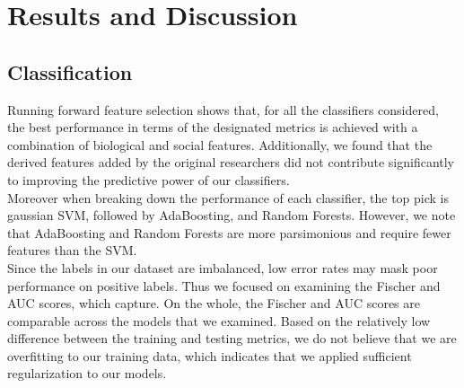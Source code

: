 \documentclass[twoside,twocolumn,paper=letter,fontsize=11pt]{article}
\begin{document}
\section{Results and Discussion}
\subsection{Classification}

Running forward feature selection shows that, for all the classifiers
considered, the best performance in terms of the designated metrics is achieved
with a combination of biological and social features. Additionally, we found that
the derived features added by the original researchers did not contribute
significantly to improving the predictive power of our classifiers.\\

Moreover when breaking down the performance of each classifier, the top pick is
gaussian SVM, followed by AdaBoosting, and Random Forests. However, we note
that AdaBoosting and Random Forests are more parsimonious and require fewer
features than the SVM. 
\\

Since the labels in our dataset are imbalanced, low error rates may mask poor
performance on positive labels. Thus we focused on examining the Fischer and AUC
scores, which capture. On the whole, the Fischer and AUC scores are comparable
across the models that we examined. Based on the relatively low difference
between the training and testing metrics, we do not believe that we are
overfitting to our training data, which indicates that we applied sufficient
regularization to our models.
\\
\end{document}
